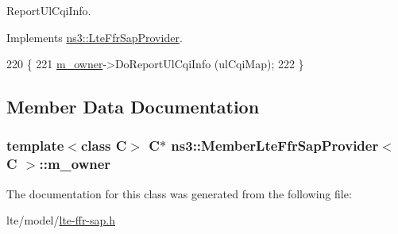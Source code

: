 Report\+Ul\+Cqi\+Info. 



Implements \hyperlink{classns3_1_1LteFfrSapProvider_a9a05b2fa50fcbe49f38b35b4db2a9d09}{ns3\+::\+Lte\+Ffr\+Sap\+Provider}.


\begin{DoxyCode}
220 \{
221   \hyperlink{classns3_1_1MemberLteFfrSapProvider_a8df6d0a27a71c7cc99ae31095b000a12}{m\_owner}->DoReportUlCqiInfo (ulCqiMap);
222 \}
\end{DoxyCode}


\subsection{Member Data Documentation}
\subsubsection[{\texorpdfstring{m\+\_\+owner}{m_owner}}]{\setlength{\rightskip}{0pt plus 5cm}template$<$class C$>$ {\bf C}$\ast$ {\bf ns3\+::\+Member\+Lte\+Ffr\+Sap\+Provider}$<$ {\bf C} $>$\+::m\+\_\+owner\hspace{0.3cm}{\ttfamily [private]}}\hypertarget{classns3_1_1MemberLteFfrSapProvider_a8df6d0a27a71c7cc99ae31095b000a12}{}\label{classns3_1_1MemberLteFfrSapProvider_a8df6d0a27a71c7cc99ae31095b000a12}


The documentation for this class was generated from the following file\+:\begin{DoxyCompactItemize}
\item 
lte/model/\hyperlink{lte-ffr-sap_8h}{lte-\/ffr-\/sap.\+h}\end{DoxyCompactItemize}
